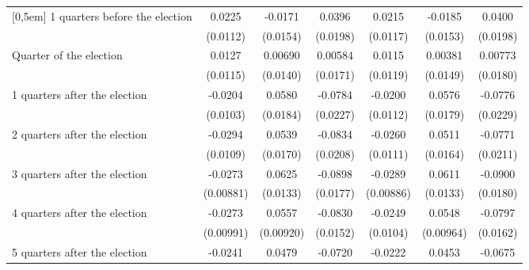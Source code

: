 \begin{table}[!ht]
\begin{tabular}{l*{6}{c}}
[0,5em]
 1 quarters before the election&      0.0225\sym{*}  &     -0.0171         &      0.0396\sym{*}  &      0.0215         &     -0.0185         &      0.0400\sym{*}  \\
                    &    (0.0112)         &    (0.0154)         &    (0.0198)         &    (0.0117)         &    (0.0153)         &    (0.0198)         \\
[0,5em]
Quarter of the election&      0.0127         &     0.00690         &     0.00584         &      0.0115         &     0.00381         &     0.00773         \\
                    &    (0.0115)         &    (0.0140)         &    (0.0171)         &    (0.0119)         &    (0.0149)         &    (0.0180)         \\
[0,5em]
 1 quarters after the election&     -0.0204\sym{*}  &      0.0580\sym{**} &     -0.0784\sym{***}&     -0.0200         &      0.0576\sym{**} &     -0.0776\sym{***}\\
                    &    (0.0103)         &    (0.0184)         &    (0.0227)         &    (0.0112)         &    (0.0179)         &    (0.0229)         \\
[0,5em]
 2 quarters after the election&     -0.0294\sym{**} &      0.0539\sym{**} &     -0.0834\sym{***}&     -0.0260\sym{*}  &      0.0511\sym{**} &     -0.0771\sym{***}\\
                    &    (0.0109)         &    (0.0170)         &    (0.0208)         &    (0.0111)         &    (0.0164)         &    (0.0211)         \\
[0,5em]
 3 quarters after the election&     -0.0273\sym{**} &      0.0625\sym{***}&     -0.0898\sym{***}&     -0.0289\sym{**} &      0.0611\sym{***}&     -0.0900\sym{***}\\
                    &   (0.00881)         &    (0.0133)         &    (0.0177)         &   (0.00886)         &    (0.0133)         &    (0.0180)         \\
[0,5em]
 4 quarters after the election&     -0.0273\sym{**} &      0.0557\sym{***}&     -0.0830\sym{***}&     -0.0249\sym{*}  &      0.0548\sym{***}&     -0.0797\sym{***}\\
                    &   (0.00991)         &   (0.00920)         &    (0.0152)         &    (0.0104)         &   (0.00964)         &    (0.0162)         \\
[0,5em]
 5 quarters after the election&     -0.0241\sym{*}  &      0.0479\sym{**} &     -0.0720\sym{***}&     -0.0222\sym{*}  &      0.0453\sym{**} &     -0.0675\sym{***}\\

\end{tabular}
\end{table}
